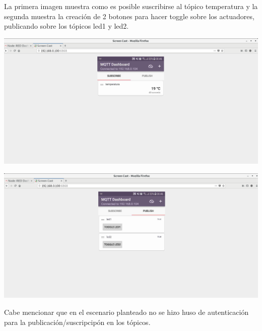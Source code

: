 \documentclass[11pt]{article}
\makeatletter
\def\maxwidth{\ifdim\Gin@nat@width>\linewidth\linewidth
    \else\Gin@nat@width\fi}
\let\Oldincludegraphics\includegraphics
\renewcommand{\includegraphics}[1]{\Oldincludegraphics[width=.8\maxwidth]{#1}}
\makeatother
\begin{document}
La primera imagen muestra como es posible suscribirse al tópico
temperatura y la segunda muestra la creación de 2 botones para hacer
toggle sobre los actuadores, publicando sobre los tópicos led1 y led2.

    \includegraphics{images/dashboard-subs.png}

    \includegraphics{images/dashboard-pub.png}

    Cabe mencionar que en el escenario planteado no se hizo huso de
autenticación para la publicación/suscripcipón en los tópicos.


    
    
    
    
\end{document}
